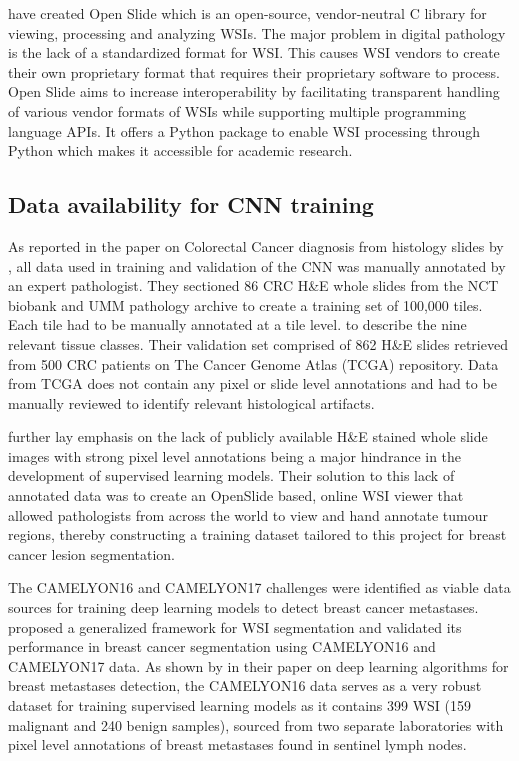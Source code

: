 \documentclass{l4proj}
\begin{document}
\cite{goode2013openslide} have created Open Slide which is an open-source, vendor-neutral C library for viewing, processing and analyzing WSIs. The major problem in digital pathology is the lack of a standardized format for WSI. This causes WSI vendors to create their own proprietary format that requires their proprietary software to process. Open Slide aims to increase interoperability by facilitating transparent handling of various vendor formats of WSIs while supporting multiple programming language APIs. It offers a Python package to enable WSI processing through Python which makes it accessible for academic research.   

\subsection{Data availability for CNN training} \label{data-availability-section}
As reported in the paper on Colorectal Cancer diagnosis from histology slides by \cite{Kather2019}, all data used in training and validation of the CNN was manually annotated by an expert pathologist. They sectioned 86 CRC H\&E whole slides from the NCT biobank and UMM pathology archive to create a training set of 100,000 tiles. Each tile had to be manually annotated at a tile level. to describe the nine relevant tissue classes. Their validation set comprised of 862 H\&E slides retrieved from 500 CRC patients on The Cancer Genome Atlas (TCGA) repository. Data from TCGA does not contain any pixel or slide level annotations and had to be manually reviewed to identify relevant histological artifacts. 

\cite{priego2020automatic} further lay emphasis on the lack of publicly available H\&E stained whole slide images with strong pixel level annotations being a major hindrance in the development of supervised learning models. Their solution to this lack of annotated data was to create an OpenSlide based, online WSI viewer that allowed pathologists from across the world to view and hand annotate tumour regions, thereby constructing a training dataset tailored to this project for breast cancer lesion segmentation.

The CAMELYON16 and CAMELYON17 challenges were identified as viable data sources for training deep learning models to detect breast cancer metastases. \cite{Khened2021} proposed a generalized framework for WSI segmentation and validated its performance in breast cancer segmentation using CAMELYON16 and CAMELYON17 data. As shown by \cite{bejnordi2017diagnostic} in their paper on deep learning algorithms for breast metastases detection, the CAMELYON16 data serves as a very robust dataset for training supervised learning models as it contains 399 WSI (159 malignant and 240 benign samples), sourced from two separate laboratories with pixel level annotations of breast metastases found in sentinel lymph nodes. 
\end{document}
